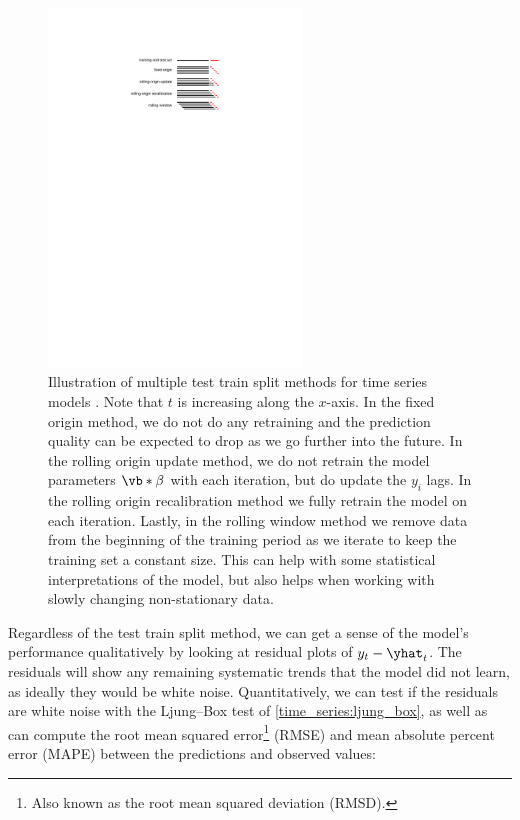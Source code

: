 \begin{figure}
\centering
\includegraphics[width=0.6\textwidth]{figures/stats/rolling_forecast_origin}
\caption{
Illustration of multiple test train split methods for time series models \cite{bergmeir_dissertation}.
Note that $t$ is increasing along the $x$-axis.
In the fixed origin method, we do not do any retraining and the prediction quality
can be expected to drop as we go further into the future.
In the rolling origin update method, we do not retrain the model parameters $\vb*{\beta}$
with each iteration, but do update the $y_{i}$ lags.
In the rolling origin recalibration method we fully retrain the model on each iteration.
Lastly, in the rolling window method we remove data from the beginning of the training period
as we iterate to keep the training set a constant size.
This can help with some statistical interpretations of the model,
but also helps when working with slowly changing non-stationary data.
}
\label{fig:rolling_forecast_origin}
\end{figure}

Regardless of the test train split method, we can get a sense of the model's performance
qualitatively by looking at residual plots of $y_{t} - \yhat_{t}$.
The residuals will show any remaining systematic trends that the model did not learn,
as ideally they would be white noise.
Quantitatively, we can test
if the residuals are white noise with the Ljung--Box test of \cref{time_series:ljung_box},
as well as can compute the
root mean squared error\footnote{Also known as the root mean squared deviation (RMSD).} (RMSE)
and mean absolute percent error (MAPE)
between the predictions and observed values:

